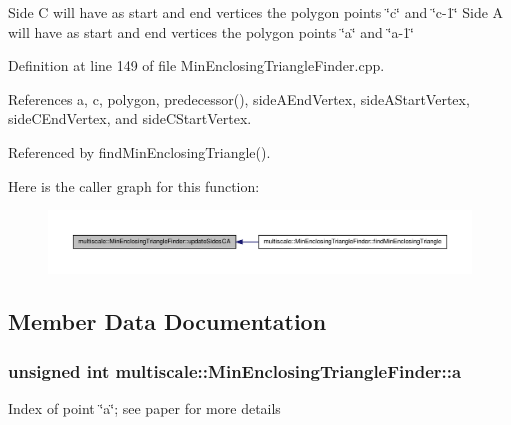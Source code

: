 \-Side \-C will have as start and end vertices the polygon points \char`\"{}c\char`\"{} and \char`\"{}c-\/1\char`\"{} \-Side \-A will have as start and end vertices the polygon points \char`\"{}a\char`\"{} and \char`\"{}a-\/1\char`\"{} 

\-Definition at line 149 of file \-Min\-Enclosing\-Triangle\-Finder.\-cpp.



\-References a, c, polygon, predecessor(), side\-A\-End\-Vertex, side\-A\-Start\-Vertex, side\-C\-End\-Vertex, and side\-C\-Start\-Vertex.



\-Referenced by find\-Min\-Enclosing\-Triangle().



\-Here is the caller graph for this function\-:
\nopagebreak
\begin{figure}[H]
\begin{center}
\leavevmode
\includegraphics[width=350pt]{classmultiscale_1_1MinEnclosingTriangleFinder_a0f4a9131f5118fa0afc33344bdf67f16_icgraph}
\end{center}
\end{figure}




\subsection{\-Member \-Data \-Documentation}
\hypertarget{classmultiscale_1_1MinEnclosingTriangleFinder_acb13371219bdd9b7c57131f1535e4c89}{
\subsubsection[{a}]{\setlength{\rightskip}{0pt plus 5cm}unsigned int {\bf multiscale\-::\-Min\-Enclosing\-Triangle\-Finder\-::a}}}\label{classmultiscale_1_1MinEnclosingTriangleFinder_acb13371219bdd9b7c57131f1535e4c89}
\-Index of point \char`\"{}a\char`\"{}; see paper for more details 

